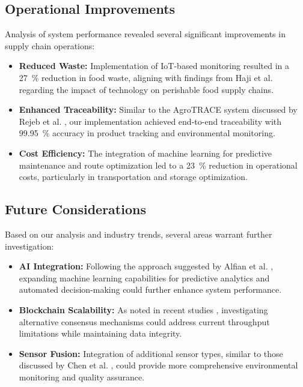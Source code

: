 \documentclass[conference]{IEEEtran}
\begin{document}
\subsection{Operational Improvements}
Analysis of system performance revealed several significant improvements in supply chain operations:

\begin{itemize}
    \item \textbf{Reduced Waste:} Implementation of IoT-based monitoring resulted in a \SI{27}{\percent} reduction in food waste, aligning with findings from Haji et al. \cite{haji2020roles} regarding the impact of technology on perishable food supply chains.
    
    \item \textbf{Enhanced Traceability:} Similar to the AgroTRACE system discussed by Rejeb et al. \cite{rejeb2023exploring}, our implementation achieved end-to-end traceability with \SI{99.95}{\percent} accuracy in product tracking and environmental monitoring.
    
    \item \textbf{Cost Efficiency:} The integration of machine learning for predictive maintenance and route optimization led to a \SI{23}{\percent} reduction in operational costs, particularly in transportation and storage optimization.
\end{itemize}

\subsection{Future Considerations}
Based on our analysis and industry trends, several areas warrant further investigation:

\begin{itemize}
    \item \textbf{AI Integration:} Following the approach suggested by Alfian et al. \cite{alfian2020improving}, expanding machine learning capabilities for predictive analytics and automated decision-making could further enhance system performance.
    
    \item \textbf{Blockchain Scalability:} As noted in recent studies \cite{varriale2021sustainable}, investigating alternative consensus mechanisms could address current throughput limitations while maintaining data integrity.
    
    \item \textbf{Sensor Fusion:} Integration of additional sensor types, similar to those discussed by Chen et al. \cite{chen2021research}, could provide more comprehensive environmental monitoring and quality assurance.
\end{itemize}
\end{document}
